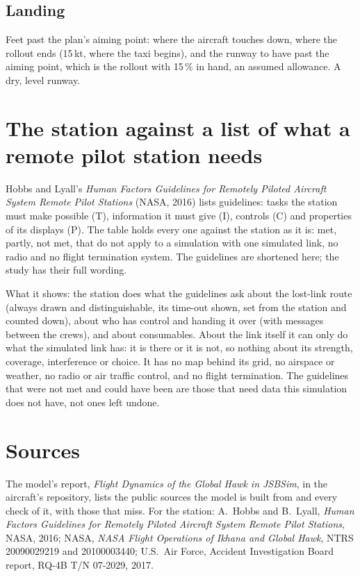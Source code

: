 \documentclass[11pt,a4paper,oneside]{book}
\newcommand{\Tab}[1]{}
\begin{document}
\section{Landing}
Feet past the plan's aiming point: where the aircraft touches down, where the rollout ends (15\,kt, where the taxi
begins), and the runway to have past the aiming point, which is the rollout with 15\,\% in hand, an assumed allowance.
A dry, level runway.
\begin{center}\small\Tab{perf_landing}\end{center}

\appendix
\chapter{The station against a list of what a remote pilot station needs}\label{app:hl}
Hobbs and Lyall's \emph{Human Factors Guidelines for Remotely Piloted Aircraft System Remote Pilot Stations} (NASA,
2016) lists \MHlAll{} guidelines: tasks the station must make possible (T), information it must give (I), controls
(C) and properties of its displays (P). The table holds every one against the station as it is: \MHlMet{} met,
\MHlPartly{} partly, \MHlNot{} not met, \MHlNa{} that do not apply to a simulation with one simulated link, no radio
and no flight termination system. The guidelines are shortened here; the study has their full wording.

What it shows: the station does what the guidelines ask about the lost-link route (always drawn and distinguishable, its
time-out shown, set from the station and counted down), about who has control and handing it over (with messages between
the crews), and about consumables. About the link itself it can only do what the simulated link has: it is there or it is
not, so nothing about its strength, coverage, interference or choice. It has no map behind its grid, no airspace or
weather, no radio or air traffic control, and no flight termination. The guidelines that were not met and could have been
are those that need data this simulation does not have, not ones left undone.
\par
{\footnotesize}

\chapter{Sources}
The model's report, \emph{Flight Dynamics of the Global Hawk in JSBSim}, in the aircraft's repository, lists the
public sources the model is built from and every check of it, with those that miss. For the station: A.~Hobbs and
B.~Lyall, \emph{Human Factors Guidelines for Remotely Piloted Aircraft System Remote Pilot Stations}, NASA, 2016; NASA,
\emph{NASA Flight Operations of Ikhana and Global Hawk}, NTRS 20090029219 and 20100003440; U.S.\ Air Force, Accident
Investigation Board report, RQ-4B T/N 07-2029, 2017.
\end{document}

